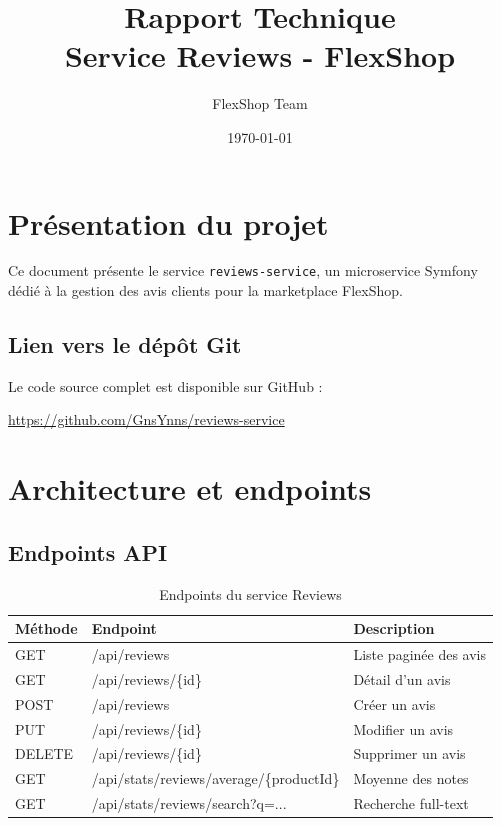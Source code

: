 \documentclass[11pt,a4paper]{article}
\title{\textbf{Rapport Technique}\\Service Reviews - FlexShop}
\author{FlexShop Team}
\date{\today}
\begin{document}
\maketitle

\section{Présentation du projet}

Ce document présente le service \texttt{reviews-service}, un microservice Symfony dédié à la gestion des avis clients pour la marketplace FlexShop.

\subsection{Lien vers le dépôt Git}

Le code source complet est disponible sur GitHub :

\begin{center}
\url{https://github.com/GnsYnns/reviews-service}
\end{center}

\section{Architecture et endpoints}

\subsection{Endpoints API}

\begin{table}[h]
\centering
\begin{tabular}{lll}
\toprule
\textbf{Méthode} & \textbf{Endpoint} & \textbf{Description} \\
\midrule
GET & /api/reviews & Liste paginée des avis \\
GET & /api/reviews/\{id\} & Détail d'un avis \\
POST & /api/reviews & Créer un avis \\
PUT & /api/reviews/\{id\} & Modifier un avis \\
DELETE & /api/reviews/\{id\} & Supprimer un avis \\
\midrule
GET & /api/stats/reviews/average/\{productId\} & Moyenne des notes \\
GET & /api/stats/reviews/search?q=... & Recherche full-text \\
\bottomrule
\end{tabular}
\caption{Endpoints du service Reviews}
\end{table}
\end{document}
